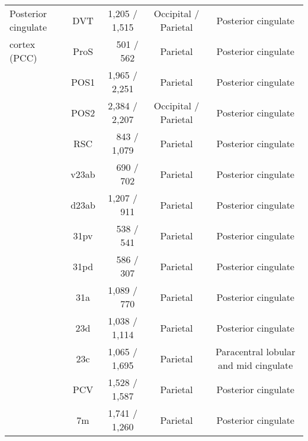 \begin{table*}[ht]
{\begin{tabular}{ l | c | c | c | c }
      \midrule

      Posterior cingulate                     & DVT                 & 1,205 / 1,515     & Occipital / Parietal  & Posterior cingulate           \\
      cortex (PCC)                            & ProS                & ~~501 / ~~562     & Parietal              & Posterior cingulate           \\
                                              & POS1                & 1,965 / 2,251     & Parietal              & Posterior cingulate           \\
                                              & POS2                & 2,384 / 2,207     & Occipital / Parietal  & Posterior cingulate    \\
                                              & RSC                 & ~~843 / 1,079     & Parietal              & Posterior cingulate    \\
                                              & v23ab               & ~~690 / ~~702     & Parietal              & Posterior cingulate    \\
                                              & d23ab               & 1,207 / ~~911     & Parietal              & Posterior cingulate    \\
                                              & 31pv                & ~~538 / ~~541     & Parietal              & Posterior cingulate    \\
                                              & 31pd                & ~~586 / ~~307     & Parietal              & Posterior cingulate    \\
                                              & 31a                 & 1,089 / ~~770     & Parietal              & Posterior cingulate    \\
                                              & 23d                 & 1,038 / 1,114     & Parietal              & Posterior cingulate                   \\
                                              & 23c                 & 1,065 / 1,695     & Parietal              & Paracentral lobular and mid cingulate \\
                                              & PCV                 & 1,528 / 1,587     & Parietal              & Posterior cingulate                   \\
                                              & 7m                  & 1,741 / 1,260     & Parietal              & Posterior cingulate                   \\


\end{tabular}}
\end{table*}
